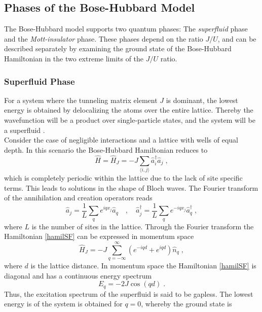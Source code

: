 \subsection{Phases of the Bose-Hubbard Model}

The Bose-Hubbard model supports two quantum phases: The \textit{superfluid} phase and the \textit{Mott-insulator} phase. These phases depend on the ratio $J/U$, and can be described separately by examining the ground state of the Bose-Hubbard Hamiltonian in the two extreme limits of the $J/U$ ratio.

\subsubsection{Superfluid Phase}
For a system where the tunneling matrix element $J$ is dominant, the lowest energy is obtained by delocalizing the atoms over the entire lattice. Thereby the wavefunction will be a product over single-particle states, and the system will be a superfluid \cite{greiner}.\\
Consider the case of negligible interactions and a lattice with wells of equal depth. In this scenario the Bose-Hubbard Hamiltonian reduces to
\begin{equation}
	\hat{H} = \hat{H}_J = - J \sum_{\langle i,j \rangle} \hat{a}_{i}^{\dag} \hat{a}_{j} \; , 
	\label{hamilSF}
\end{equation}
which is completely periodic within the lattice due to the lack of site specific terms. This leads to solutions in the shape of Bloch waves. The Fourier transform of the annihilation and creation operators reads
\begin{equation}
	\hat{a}_j = \frac{1}{L} \sum_{q}  e^{i q x_j} \hat{a}_q \quad , \quad
	\hat{a}_{j}^{\dag} = \frac{1}{L} \sum_{q}  e^{-i q x_j} \hat{a}_{q}^{\dag} \; ,
\end{equation}
where $L$ is the number of sites in the lattice. Through the Fourier transform the Hamiltonian \eqref{hamilSF} can be expressed in momentum space
\begin{equation}
	\hat{H}_J = - J \sum_{q = - \infty}^{\infty} \left( e^{- i q d } + e^{i q d} \right) \hat{n}_q \; ,
\end{equation}
where $d$ is the lattice distance. In momentum space the Hamiltonian \eqref{hamilSF} is diagonal and has a continuous energy spectrum
\begin{equation}
	E_q = -2 J \cos(q d) \; .
	\label{SFenergy}
\end{equation}
Thus, the excitation spectrum of the superfluid is said to be gapless. The lowest energy is of the system is obtained for $q = 0$, whereby the ground state is
